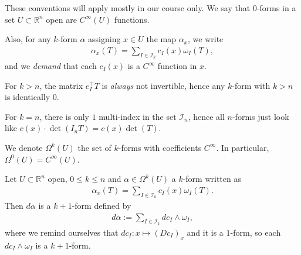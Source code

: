\begin{definition}\label{def:conv-forms}
	These conventions will apply mostly in our course only. We say that $0$-forms in a set $U \subset \mathbb{R}^{n}$ open are $C^{\infty}(U)$ functions.

	Also, for any $k$-form $\alpha $ assigning $x \in U$ the map $\alpha_{x}$, we write
	\begin{align*}
		\alpha_{x}(T) = \sum_{I \in \mathcal{I}_{k}}^{} c_{I}(x) \omega_{I}(T),
	\end{align*}
	and we \textit{demand} that each $c_{I}(x)$ is a $C^{\infty}$ function in $x$.

	For $k > n$, the matrix $e_{I}^\top T$ is \textit{always} not invertible, hence any $k$-form with $k>n$ is identically $0$.

	For $k = n$, there is only $1$ multi-index in the set $\mathcal{I}_{n}$, hence all $n$-forms just look like $c(x) \cdot \det (I_{n} T) = c(x) \det (T)$.

	We denote $\Omega^{k}(U)$ the set of $k$-forms with coefficients $C^{\infty}$. In particular, $\Omega^{0}(U) = C^{\infty}(U)$.
\end{definition}

\begin{definition}[Differential]\label{def:differential-forms-version}
	Let $U \subset \mathbb{R}^{n}$ open, $0 \leq k \leq n$ and $\alpha \in \Omega^{k}(U)$ a $k$-form written as
	\begin{align*}
		\alpha_{x}(T) = \sum_{I \in \mathcal{I}_{k}} c_{I}(x) \omega_{I}(T).
	\end{align*}
	Then $d\alpha $ is a $k+1$-form defined by
	\begin{align*}
		d\alpha  := \sum_{I \in \mathcal{I}_{k}} dc_{I} \wedge \omega_{I},
	\end{align*}
	where we remind ourselves that $dc_{I}: x \mapsto (Dc_{I})_{x}$ and it is a $1$-form, so each $dc_{I} \wedge \omega_{I}$ is a $k+1$-form.
\end{definition}


